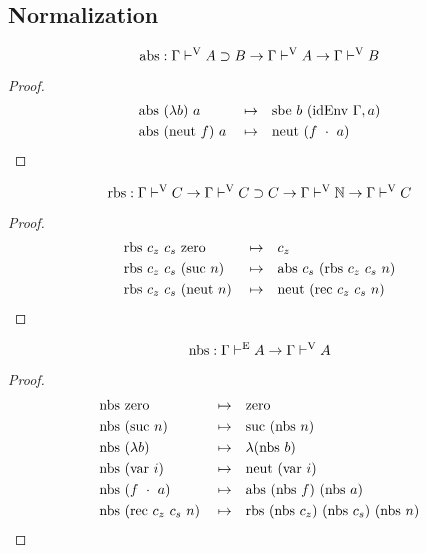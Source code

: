 \documentclass{llncs}
\def\dfn{\mapsto}
\def\arr{\supset}
\def\marr{\rightarrow}
\def\app{\cdot}
\def\lam{\lambda}
\def\nat{\mathbb{N}}
\def\var{\con{var}}
\def\zero{\con{zero}}
\def\suc{\con{suc}}
\def\neut{\con{neut}}
\def\rec{\fun{rec}}
\def\rbs{\fun{rbs}}
\def\abs{\fun{abs}}
\def\sbe{\fun{sbe}}
\def\nbs{\fun{nbs}}
\def\idenv{\fun{idEnv}}
\newcommand{\turn}[1]{\vdash^\con{#1}}
\newcommand{\con}[1]{\textmd{#1}}
\newcommand{\fun}[1]{\textmd{#1}}
\newcommand{\type}[1]{\Gamma \turn{E} #1}
\newcommand{\typv}[1]{\Gamma \turn{V} #1}
\begin{document}
\subsection{Normalization}

\begin{theorem}
\label{thm:mod:abs}
$$
\abs : \typv{A \arr B} \marr \typv{A} \marr \typv{B}
$$

\begin{proof}
\begin{align*}
&\abs ~ (\lam b) ~ a &&\dfn&& \sbe~b~(\idenv~\Gamma, a)\\
&\abs ~ (\neut~f) ~ a &&\dfn&& \neut~(f~\app~a)
\end{align*}
\end{proof}

\end{theorem}

\begin{theorem}
\label{thm:mod:rbs}
$$
\rbs : \typv{C} \marr \typv{C \arr C} \marr \typv{\nat} \marr \typv{C}
$$

\begin{proof}
\begin{align*}
&\rbs ~ c_z ~ c_s ~ \zero &&\dfn&& c_z\\
&\rbs ~ c_z ~ c_s ~ (\suc~n) &&\dfn&& \abs~c_s~(\rbs~c_z~c_s~n)\\
&\rbs ~ c_z ~ c_s ~ (\neut~n) &&\dfn&& \neut~(\rec~c_z~c_s~n)
\end{align*}
\end{proof}

\end{theorem}

\begin{theorem}
\label{thm:mod:nbs}
$$
\nbs : \type{A} \marr \typv{A}
$$

\begin{proof}
\begin{align*}
&\nbs ~ \zero &&\dfn&& \zero\\
&\nbs ~ (\suc~n) &&\dfn&& \suc ~ (\nbs~n)\\
&\nbs ~ (\lam b) &&\dfn&& \lam (\nbs~b)\\
&\nbs ~ (\var~i) &&\dfn&& \neut ~ (\var~i)\\
&\nbs ~ (f~\app~a) &&\dfn&& \abs ~ (\nbs~f) ~ (\nbs~a)\\
&\nbs ~ (\rec~c_z~c_s~n) &&\dfn&& \rbs~(\nbs~c_z)~(\nbs~c_s)~(\nbs~n)
\end{align*}
\end{proof}



\end{theorem}
\end{document}
